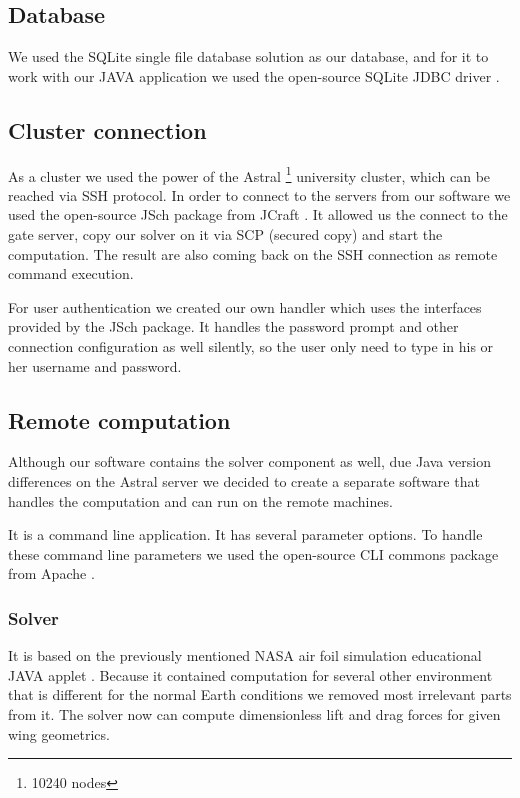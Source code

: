 \documentclass[10pt,a4paper]{report}
\begin{document}
\subsection{Database}
We used the SQLite single file database solution as our database, and for it to work with our JAVA application we used the open-source SQLite JDBC driver \cite{WWW:SQLite}.

\subsection{Cluster connection}
As a cluster we used the power of the Astral \footnote{10240 nodes} university cluster, which can be reached via SSH protocol. In order to connect to the servers from our software we used the open-source JSch package from JCraft \cite{WWW:JSCH}. It allowed us the connect to the gate server, copy our solver on it via SCP (secured copy) and start the computation. The result are also coming back on the SSH connection as remote command execution.

For user authentication we created our own handler which uses the interfaces provided by the JSch package. It handles the password prompt and other connection configuration as well silently, so the user only need to type in his or her username and password.

\subsection{Remote computation}
Although our software contains the solver component as well, due Java version differences on the Astral server we decided to create a separate software that handles the computation and can run on the remote machines.

It is a command line application. It has several parameter options. To handle these command line parameters we used the open-source CLI commons package from Apache \cite{WWW:CLI}.

\subsubsection{Solver}
It is based on the previously mentioned NASA air foil simulation educational JAVA applet \cite{WWW:NASA}. Because it contained computation for several other environment that is different for the normal Earth conditions we removed most irrelevant parts from it. The solver now can compute dimensionless lift and drag forces for given wing geometrics.
\end{document}
